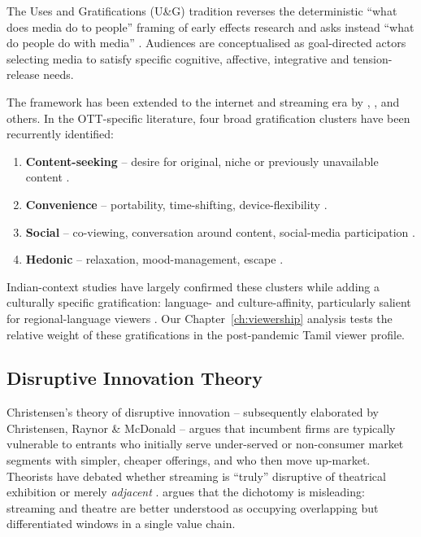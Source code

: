 The Uses and Gratifications (U\&G) tradition reverses the deterministic
``what does media do to people'' framing of early effects research and
asks instead ``what do people do with media'' \citep{katz1973,
blumler1979}.  Audiences are conceptualised as goal-directed actors
selecting media to satisfy specific cognitive, affective, integrative
and tension-release needs.

The framework has been extended to the internet and streaming era by
\citet{ruggiero2000}, \citet{papacharissi2000}, \citet{sundar2013} and
others.  In the OTT-specific literature, four broad gratification
clusters have been recurrently identified:

\begin{enumerate}[itemsep=2pt]
  \item \textbf{Content-seeking} -- desire for original, niche or
        previously unavailable content \citep{sundet2021,jenner2018,
        lotz2017}.
  \item \textbf{Convenience} -- portability, time-shifting,
        device-flexibility \citep{lotz2017,tryon2013}.
  \item \textbf{Social} -- co-viewing, conversation around content,
        social-media participation \citep{pittman2016,lim2020}.
  \item \textbf{Hedonic} -- relaxation, mood-management, escape
        \citep{tefertiller2017,reer2017}.
\end{enumerate}

Indian-context studies have largely confirmed these clusters
\citep{singh2021,gupta2022uses,parmar2021} while adding a culturally
specific gratification: language- and culture-affinity, particularly
salient for regional-language viewers \citep{punathambekar2013,
nakassis2017}.  Our Chapter~\ref{ch:viewership} analysis tests the
relative weight of these gratifications in the post-pandemic Tamil
viewer profile.

\subsection{Disruptive Innovation Theory}
\label{sec:disruption}

Christensen's \citeyearpar{christensen1997} theory of disruptive
innovation -- subsequently elaborated by Christensen, Raynor \&
McDonald \citep{christensen2015} -- argues that incumbent firms are
typically vulnerable to entrants who initially serve under-served or
non-consumer market segments with simpler, cheaper offerings, and who
then move up-market.  Theorists have debated whether streaming is
``truly'' disruptive of theatrical exhibition or merely
\emph{adjacent} \citep{wayne2018,fagerjord2018}.  \citet{lobato2019}
argues that the dichotomy is misleading: streaming and theatre are
better understood as occupying overlapping but differentiated
windows in a single value chain.

